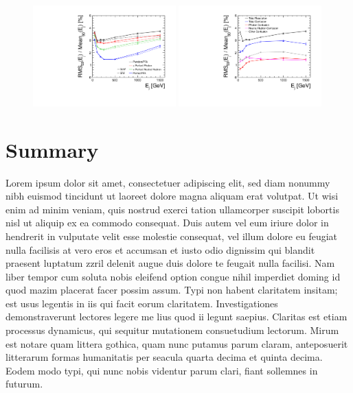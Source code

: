 \documentclass[final,3p,times,twocolumn]{elsarticle}
\begin{document}
\begin{figure}[!h]
  \begin{center}
     \includegraphics[width=0.49\textwidth]{HighEnergy_ResDiffAlgs.pdf}
     \includegraphics[width=0.49\textwidth]{HighEnergy_ScWConf.pdf}
     \caption{\label{}}
  \end{center}
\end{figure}


\section{Summary}
 Lorem ipsum dolor sit amet, consectetuer adipiscing elit, sed diam nonummy nibh euismod tincidunt ut laoreet dolore magna aliquam erat volutpat. Ut wisi enim ad minim veniam, quis
nostrud exerci tation ullamcorper suscipit lobortis nisl ut aliquip ex ea commodo consequat. Duis autem vel eum iriure dolor in hendrerit in vulputate velit esse molestie consequat,
vel illum dolore eu feugiat nulla facilisis at vero eros et accumsan et iusto odio dignissim qui blandit praesent luptatum zzril delenit augue duis dolore te feugait nulla facilisi.
Nam liber tempor cum soluta nobis eleifend option congue nihil imperdiet doming id quod mazim placerat facer possim assum. Typi non habent claritatem insitam; est usus legentis in
iis qui facit eorum claritatem. Investigationes demonstraverunt lectores legere me lius quod ii legunt saepius. Claritas est etiam processus dynamicus, qui sequitur mutationem
consuetudium lectorum. Mirum est notare quam littera gothica, quam nunc putamus parum claram, anteposuerit litterarum formas humanitatis per seacula quarta decima et quinta
decima. Eodem modo typi, qui nunc nobis videntur parum clari, fiant sollemnes in futurum.
\end{document}
